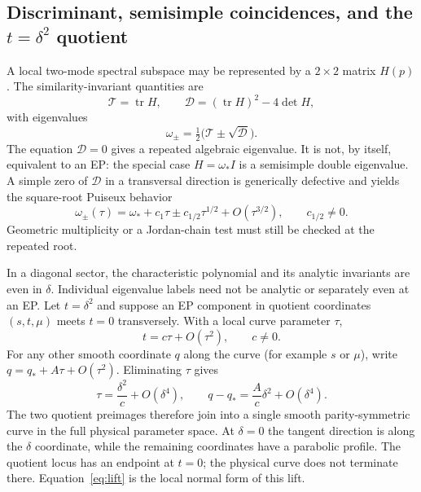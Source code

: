 \documentclass[10pt]{article}
\theoremstyle{plain}
\DeclareMathOperator{\tr}{tr}
\begin{document}
\subsection{Discriminant, semisimple coincidences, and the
\texorpdfstring{$t=\delta^2$}{t = delta squared} quotient}

A local two-mode spectral subspace may be represented by a $2\times2$ matrix
$H(p)$. The similarity-invariant quantities are
\begin{equation}
\mathcal{T}=\tr H,\qquad \mathcal{D}=(\tr H)^2-4\det H,
\end{equation}
with eigenvalues
\begin{equation}
\omega_\pm=\tfrac{1}{2}\bigl(\mathcal{T}\pm\sqrt{\mathcal{D}}\bigr).
\end{equation}
The equation $\mathcal{D}=0$ gives a repeated algebraic eigenvalue. It is not,
by itself, equivalent to an EP: the special case $H=\omega_*I$ is a semisimple
double eigenvalue. A simple zero of $\mathcal{D}$ in a transversal direction is
generically defective and yields the square-root Puiseux behavior
\begin{equation}
\omega_\pm(\tau)=\omega_*+c_1\tau\pm c_{1/2}\tau^{1/2}+O(\tau^{3/2}),
\qquad c_{1/2}\neq0.
\end{equation}
Geometric multiplicity or a Jordan-chain test must still be checked at the
repeated root.

In a diagonal sector, the characteristic polynomial and its analytic invariants
are even in $\delta$. Individual eigenvalue labels need not be analytic or
separately even at an EP. Let $t=\delta^2$ and suppose an EP component in
quotient coordinates $(s,t,\mu)$ meets $t=0$ transversely. With a local curve
parameter $\tau$,
\begin{equation}
t=c\tau+O(\tau^2),\qquad c\neq0.
\end{equation}
For any other smooth coordinate $q$ along the curve (for example $s$ or $\mu$),
write $q=q_*+A\tau+O(\tau^2)$. Eliminating $\tau$ gives
\begin{equation}
\tau=\frac{\delta^2}{c}+O(\delta^4),\qquad
q-q_*=\frac{A}{c}\delta^2+O(\delta^4).
\label{eq:lift}
\end{equation}
The two quotient preimages therefore join into a single smooth
parity-symmetric curve in the full physical parameter space. At $\delta=0$ the
tangent direction is along the $\delta$ coordinate, while the remaining
coordinates have a parabolic profile. The quotient locus has an endpoint at
$t=0$; the physical curve does not terminate there. Equation~\eqref{eq:lift} is
the local normal form of this lift.
\end{document}

